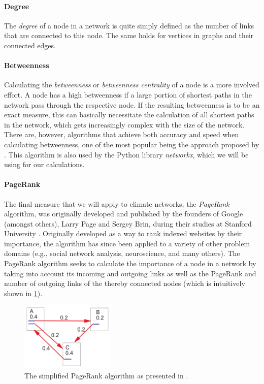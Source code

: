 \paragraph{Degree}
The \textit{degree} of a node in a network is quite simply defined as the number of links that are connected to this node. The same holds for vertices in graphs and their connected edges.

\paragraph{Betweenness}
Calculating the \textit{betweenness} or \textit{betweenness centrality} of a node is a more involved effort. A node has a high betweenness if a large portion of shortest paths in the network pass through the respective node. If the resulting betweenness is to be an exact measure, this can basically necessitate the calculation of all shortest paths in the network, which gets increasingly complex with the size of the network. There are, however, algorithms that achieve both accuracy and speed when calculating betweenness, one of the most popular being the approach proposed by \citet{Brandes.2001}. This algorithm is also used by the Python library \textit{networkx}, which we will be using for our calculations.

\paragraph{PageRank}
The final measure that we will apply to climate networks, the \textit{PageRank} algorithm, was originally developed and published by the founders of Google (amongst others), Larry Page and Sergey Brin, during their studies at Stanford University \citep{Page.1999}. Originally developed as a way to rank indexed websites by their importance, the algorithm has since been applied to a variety of other problem domains (e.g., social network analysis, neuroscience, and many others). The PageRank algorithm seeks to calculate the importance of a node in a network by taking into account its incoming and outgoing links as well as the PageRank and number of outgoing links of the thereby connected nodes (which is intuitively shown in \cref{fig:simplified_pagerank}).

\begin{figure}[h]
  \centering
  \includegraphics[width=0.4\textwidth]{./99_appendix/img/simplified_pagerank}
  \caption{The simplified PageRank algorithm as presented in \citet{Page.1999}.}
  \label{fig:simplified_pagerank}
\end{figure}

